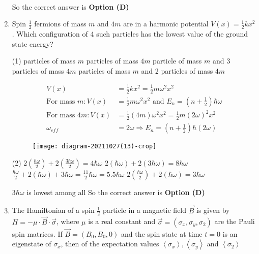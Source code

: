 \begin{enumerate}
\begin{answer}
\begin{align*}
\end{align*}
So the correct answer is \textbf{Option (D)}
\end{answer}
	\item Spin $\frac{1}{2}$ fermions of mass $m$ and $4 m$ are in a harmonic potential $V(x)=\frac{1}{2} k x^{2}$. Which configuration of 4 such particles has the lowest value of the ground state energy?
{	}
\begin{tasks}(1)
 particles of mass $m$
 particles of mass $4 m$
 particle of mass $m$ and 3 particles of mass $4 m$
 particles of mass $m$ and 2 particles of mass $4 m$
\end{tasks}
\begin{answer}
\begin{align*}
V(x)&=\frac{1}{2} k x^{2}=\frac{1}{2} m \omega^{2} x^{2}\\
\text{For mass }m: V(x)&=\frac{1}{2} m \omega^{2} x^{2}\text{ and } E_{n}=\left(n+\frac{1}{2}\right) \hbar \omega\\
\text{For mass }4 m: V(x)&=\frac{1}{2}(4 m) \omega^{2} x^{2}=\frac{1}{2} m(2 \omega)^{2} x^{2}\\
\omega_{e f f}&=2 \omega \Rightarrow E_{n}=\left(n+\frac{1}{2}\right) \hbar(2 \omega)
\end{align*}
\begin{figure}[H]
	\centering
	\texttt{[image: diagram-20211027(13)-crop]}
\end{figure}
\begin{tasks}(2)
	\task[\textbf{A.}] $2\left(\frac{\hbar \omega}{2}\right)+2\left(\frac{3 \hbar \omega}{2}\right)=4 \hbar \omega$
	\task[\textbf{B.}]  $2(\hbar \omega)+2(3 \hbar \omega)=8 \hbar \omega$
	\task[\textbf{C.}] $\frac{\hbar \omega}{2}+2(\hbar \omega)+3 \hbar \omega=\frac{11}{2} \hbar \omega=5.5 \hbar \omega$
	\task[\textbf{D.}] $2\left(\frac{\hbar \omega}{2}\right)+2(\hbar \omega)=3 \hbar \omega$
\end{tasks}
$3 \hbar \omega$ is lowest among all 
So the correct answer is \textbf{Option (D)}
\end{answer}
	\item The Hamiltonian of a spin $\frac{1}{2}$ particle in a magnetic field $\vec{B}$ is given by $H=-\mu \cdot \vec{B} \cdot \vec{\sigma}$, where $\mu$ is a real constant and $\vec{\sigma}=\left(\sigma_{x}, \sigma_{y}, \sigma_{2}\right)$ are the Pauli spin matrices. If $\vec{B}=\left(B_{0}, B_{0}, 0\right)$ and the spin state at time $t=0$ is an eigenstate of $\sigma_{x}$, then of the expectation values $\left\langle\sigma_{x}\right\rangle,\left\langle\sigma_{y}\right\rangle$ and $\left\langle\sigma_{2}\right\rangle$

\end{enumerate}

